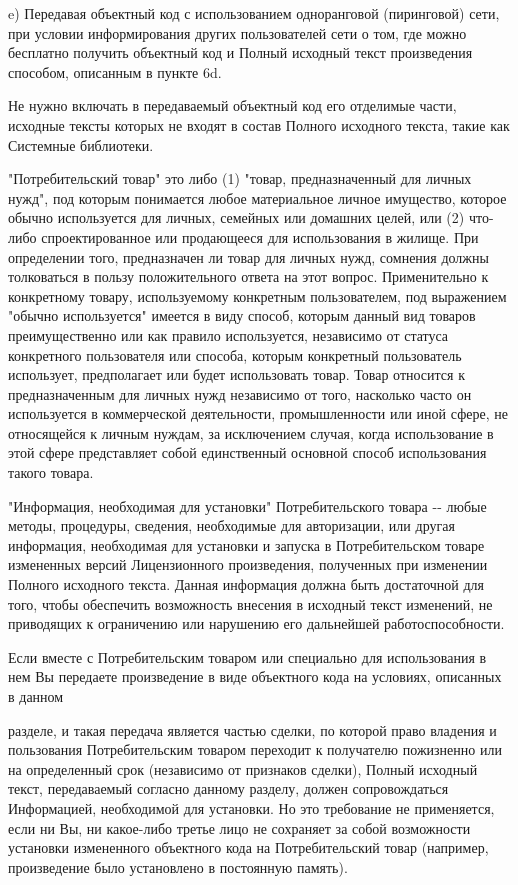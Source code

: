 e) Передавая объектный код с использованием одноранговой (пиринговой) сети, при условии информирования других пользователей сети о том, где можно бесплатно получить объектный код и Полный исходный текст произведения способом, описанным в пункте 6d.

Не нужно включать в передаваемый объектный код его отделимые части, исходные тексты которых не входят в состав Полного исходного текста, такие как Системные библиотеки.

"{}Потребительский товар"{} это либо (1) "{}товар, предназначенный для личных нужд"{}, под которым понимается любое материальное личное имущество, которое обычно используется для личных, семейных или домашних целей, или (2) что-\/либо спроектированное или продающееся для использования в жилище. При определении того, предназначен ли товар для личных нужд, сомнения должны толковаться в пользу положительного ответа на этот вопрос. Применительно к конкретному товару, используемому конкретным пользователем, под выражением "{}обычно используется"{} имеется в виду способ, которым данный вид товаров преимущественно или как правило используется, независимо от статуса конкретного пользователя или способа, которым конкретный пользователь использует, предполагает или будет использовать товар. Товар относится к предназначенным для личных нужд независимо от того, насколько часто он используется в коммерческой деятельности, промышленности или иной сфере, не относящейся к личным нуждам, за исключением случая, когда использование в этой сфере представляет собой единственный основной способ использования такого товара.

"{}Информация, необходимая для установки"{} Потребительского товара -\/-\/ любые методы, процедуры, сведения, необходимые для авторизации, или другая информация, необходимая для установки и запуска в Потребительском товаре измененных версий Лицензионного произведения, полученных при изменении Полного исходного текста. Данная информация должна быть достаточной для того, чтобы обеспечить возможность внесения в исходный текст изменений, не приводящих к ограничению или нарушению его дальнейшей работоспособности.

Если вместе с Потребительским товаром или специально для использования в нем Вы передаете произведение в виде объектного кода на условиях, описанных в данном

разделе, и такая передача является частью сделки, по которой право владения и пользования Потребительским товаром переходит к получателю пожизненно или на определенный срок (независимо от признаков сделки), Полный исходный текст, передаваемый согласно данному разделу, должен сопровождаться Информацией, необходимой для установки. Но это требование не применяется, если ни Вы, ни какое-\/либо третье лицо не сохраняет за собой возможности установки измененного объектного кода на Потребительский товар (например, произведение было установлено в постоянную память).

